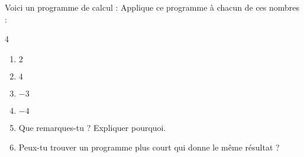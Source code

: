 \begin{exercice*}
    Voici un programme de calcul :
    Applique ce programme à chacun de ces nombres :
    \begin{multicols}4
        \begin{enumerate}
            \item $ 2 $
            \item $ 4 $
            \item $ -3 $
            \item $ -4 $
        \end{enumerate}
    \end{multicols}
    \begin{enumerate}
        \setcounter{enumi}{4}
        \item Que remarques-tu ? Expliquer pourquoi.
        \item Peux-tu trouver un programme plus court qui donne le même résultat ?
    \end{enumerate}
        
\end{exercice*}
